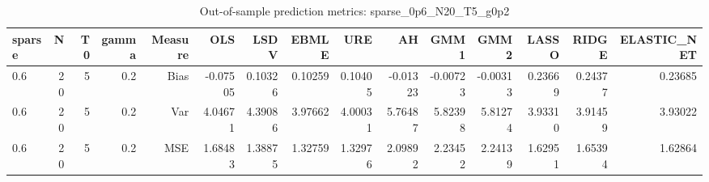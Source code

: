 \begin{table}[!htbp]\centering
\caption{Out-of-sample prediction metrics: sparse_0p6_N20_T5_g0p2}
\label{tab:table3_sparse_0p6_N20_T5_g0p2}
\begin{tabular}{lrrrrrrrrrrrrrr}
\hline
sparse & N & T0 & gamma & Measure & OLS & LSDV & EBMLE & URE & AH & GMM1 & GMM2 & LASSO & RIDGE & ELASTIC_NET \\
\hline
0.6 & 20 & 5 & 0.2 & Bias & -0.07505 & 0.10326 & 0.10259 & 0.10405 & -0.01323 & -0.00723 & -0.00313 & 0.23669 & 0.24377 & 0.23685 \\
0.6 & 20 & 5 & 0.2 & Var & 4.04671 & 4.39086 & 3.97662 & 4.00031 & 5.76487 & 5.82398 & 5.81274 & 3.93310 & 3.91459 & 3.93022 \\
0.6 & 20 & 5 & 0.2 & MSE & 1.68483 & 1.38875 & 1.32759 & 1.32976 & 2.09892 & 2.23452 & 2.24139 & 1.62951 & 1.65394 & 1.62864 \\
\hline
\end{tabular}
\end{table}


